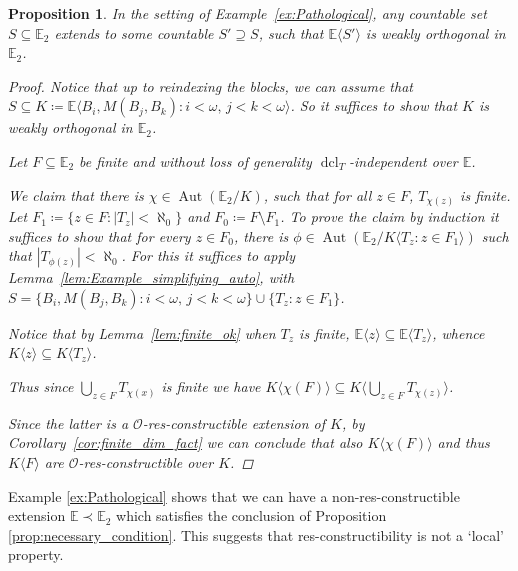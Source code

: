 \documentclass{amsart}
\newtheorem{proposition}[theorem]{Proposition}
\theoremstyle{remark}
\theoremstyle{definition}
\theoremstyle{plain}
\newcommand{\bE}{\mathbb E}
\newcommand{\cO}{\mathcal O}
\DeclareMathOperator{\dcl}{\mathrm{dcl}}
\DeclareMathOperator{\Aut}{\mathrm{Aut}}
\theoremstyle{plain}
\begin{document}
\begin{proposition}
    In the setting of Example~\ref{ex:Pathological}, any countable set $S \subseteq \bE_2$ extends to some countable $S'\supseteq S$, such that $\bE \langle S'\rangle$ is weakly orthogonal in $\bE_2$.
    \begin{proof}
        Notice that up to reindexing the blocks, we can assume that $S\subseteq K\coloneqq \bE \langle B_i, M(B_j, B_k): i<\omega, \, j<k<\omega\rangle$. So it suffices to show that $K$ is weakly orthogonal in $\bE_2$.

        Let $F\subseteq\bE_2$ be finite and without loss of generality $\dcl_T$-independent over $\bE$.
        
        We claim that there is $\chi \in \Aut(\bE_2/K)$, such that for all $z \in F$, $T_{\chi(z)}$ is finite. Let $F_1\coloneqq \{z \in F: |T_{z}|<\aleph_0\}$ and $F_0\coloneqq F\setminus F_1$. To prove the claim by induction it suffices to show that for every $z \in F_0$, there is $\phi \in \Aut(\bE_2/K\langle T_{z}: z \in F_1\rangle)$ such that $|T_{\phi(z)}|<\aleph_0$. For this it suffices to apply Lemma~\ref{lem:Example_simplifying_auto}, with $S=\{B_i, M(B_j, B_k): i<\omega, \, j<k<\omega\} \cup \{T_z: z \in F_1\}$.

        Notice that by Lemma~\ref{lem:finite_ok} when $T_z$ is finite, $\bE\langle z\rangle \subseteq \bE \langle T_z\rangle$, whence $K\langle z \rangle \subseteq K \langle T_z\rangle$.
        
        Thus since $\bigcup_{z \in F} T_{\chi(x)}$ is finite we have $K \langle \chi(F) \rangle \subseteq K\langle \bigcup_{z \in F} T_{\chi(z)}\rangle$.
        
        Since the latter is a $\cO$-res-constructible extension of $K$, by Corollary~\ref{cor:finite_dim_fact} we can conclude that also $K\langle \chi(F) \rangle$ and thus $K\langle F \rangle$ are $\cO$-res-constructible over $K$.
    \end{proof}
\end{proposition}
Example \ref{ex:Pathological} shows that we can have a non-res-constructible extension $\bE \prec \bE_2$ which satisfies the conclusion of Proposition \ref{prop:necessary_condition}. This suggests that res-constructibility is not a `local' property.



\end{document}
